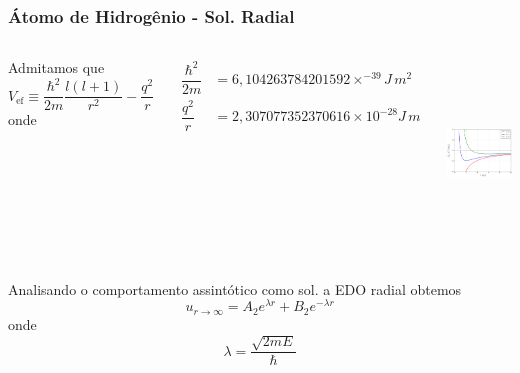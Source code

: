 \documentclass[12pt,brazil,table]{beamer}
\begin{document}


\begin{frame} 
  \frametitle{Átomo de Hidrogênio - Sol. Radial}
  \fontsize{8pt}{11pt}\selectfont
  
  
    \begin{columns}[T]

      
        Admitamos que
        \[
        V_{\text{ef}} \equiv \dfrac{\hbar^2}{2m}\dfrac{l(l+1)}{r^2} - \dfrac{q^2}{r}
        \]
        onde
        
        \begin{align*}
          \dfrac{\hbar^2}{2m} &= 6,104263784201592\times^{-39}J\,m^2\\
          \dfrac{q^2}{r} &= 2,307077352370616\times 10^{-28} J\,m
        \end{align*}
      
      
      
      \begin{center}
        \includegraphics[height=5cm]{figuras/fig42}
      \end{center}
    
    \end{columns}
  
    
    
    Analisando o comportamento assintótico como sol. a EDO radial obtemos
    \[
     u_{r \to \infty} = A_2e^{\lambda r} + B_2 e^{-\lambda r}
    \]
    onde
    \[
     \lambda = \dfrac{\sqrt{2mE}}{\hbar}
    \]


\end{frame}


\end{document}
